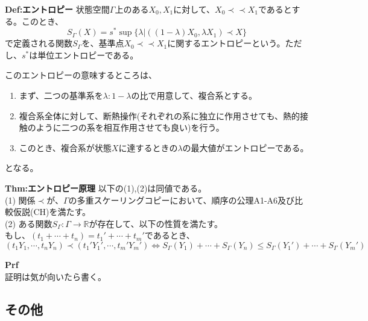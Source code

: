 \documentclass[a4paper,11pt]{jsarticle}
\numberwithin{equation}{section}
\begin{document}
\begin{itembox}[l]{\textbf{Def:エントロピー}}
  状態空間$\Gamma$上のある$X_0,X_1$に対して、$X_0 \prec \prec X_1$であるとする。このとき、
  \begin{equation}
      S_{\Gamma}(X) = s^* \sup\{\lambda|((1-\lambda)X_0,\lambda X_1) \prec X\}
  \end{equation}
  で定義される関数$S_{\Gamma}$を、基準点$X_0 \prec \prec X_1$に関するエントロピーという。ただし、$s^*$は単位エントロピーである。
\end{itembox}
このエントロピーの意味するところは、
\begin{enumerate}
  \item まず、二つの基準系を$\lambda : 1-\lambda$の比で用意して、複合系とする。
  \item 複合系全体に対して、断熱操作(それぞれの系に独立に作用させても、熱的接触のように二つの系を相互作用させても良い)を行う。
  \item このとき、複合系が状態$X$に達するときの$\lambda$の最大値がエントロピーである。
\end{enumerate}
となる。\\

\begin{itembox}[l]{\textbf{Thm:エントロピー原理}}
  以下の(1),(2)は同値である。\\
  (1) 関係$\prec$が、$\Gamma$の多重スケーリングコピーにおいて、順序の公理A1-A6及び比較仮説(CH)を満たす。\\
  (2) ある関数$S_{\Gamma}:\Gamma \rightarrow \mathbb{R}$が存在して、以下の性質を満たす。\\
  もし、$(t_1+ \cdots +t_n)=t_1'+ \cdots +t_m'$であるとき、
  \begin{equation}
      (t_1 Y_1, \cdots ,t_n Y_n) \prec (t_1' Y_1', \cdots ,t_m' Y_m') \Leftrightarrow S_{\Gamma}(Y_1)+ \cdots +S_{\Gamma}(Y_n) \leq S_{\Gamma}(Y_1')+ \cdots +S_{\Gamma}(Y_m')
  \end{equation}
\end{itembox}
\textbf{Prf}\\
証明は気が向いたら書く。\\

\subsection{その他}
\end{document}

